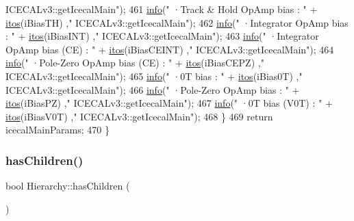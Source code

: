 \begin{DoxyCode}
{      ICECALv3::getIcecalMain"});
461         \hyperlink{classObject_a644fd329ea4cb85f54fa6846484b84a8}{info}(\textcolor{stringliteral}{"   ·Track & Hold OpAmp bias          : "} + \hyperlink{Tools_8h_af330027dbdafb9a30768b3613c553e60}{itos}(iBiasTH)          ,\textcolor{stringliteral}{"
      ICECALv3::getIcecalMain"});
462         \hyperlink{classObject_a644fd329ea4cb85f54fa6846484b84a8}{info}(\textcolor{stringliteral}{"   ·Integrator OpAmp bias            : "} + \hyperlink{Tools_8h_af330027dbdafb9a30768b3613c553e60}{itos}(iBiasINT)         ,\textcolor{stringliteral}{"
      ICECALv3::getIcecalMain"});
463         \hyperlink{classObject_a644fd329ea4cb85f54fa6846484b84a8}{info}(\textcolor{stringliteral}{"   ·Integrator OpAmp bias (CE)       : "} + \hyperlink{Tools_8h_af330027dbdafb9a30768b3613c553e60}{itos}(iBiasCEINT)       ,\textcolor{stringliteral}{"
      ICECALv3::getIcecalMain"});
464         \hyperlink{classObject_a644fd329ea4cb85f54fa6846484b84a8}{info}(\textcolor{stringliteral}{"   ·Pole-Zero OpAmp bias (CE)        : "} + \hyperlink{Tools_8h_af330027dbdafb9a30768b3613c553e60}{itos}(iBiasCEPZ)        ,\textcolor{stringliteral}{"
      ICECALv3::getIcecalMain"});
465         \hyperlink{classObject_a644fd329ea4cb85f54fa6846484b84a8}{info}(\textcolor{stringliteral}{"   ·0T bias                    : "} + \hyperlink{Tools_8h_af330027dbdafb9a30768b3613c553e60}{itos}(iBias0T)            ,\textcolor{stringliteral}{"
      ICECALv3::getIcecalMain"});
466         \hyperlink{classObject_a644fd329ea4cb85f54fa6846484b84a8}{info}(\textcolor{stringliteral}{"   ·Pole-Zero OpAmp bias             : "} + \hyperlink{Tools_8h_af330027dbdafb9a30768b3613c553e60}{itos}(iBiasPZ)          ,\textcolor{stringliteral}{"
      ICECALv3::getIcecalMain"});
467         \hyperlink{classObject_a644fd329ea4cb85f54fa6846484b84a8}{info}(\textcolor{stringliteral}{"   ·0T bias (V0T)              : "} + \hyperlink{Tools_8h_af330027dbdafb9a30768b3613c553e60}{itos}(iBiasV0T)           ,\textcolor{stringliteral}{"
      ICECALv3::getIcecalMain"});
468     \}
469     \textcolor{keywordflow}{return} icecalMainParams;
470 \}
\end{DoxyCode}
\mbox{\label{classHierarchy_a255174fe4d316d2a3f430dcb9dab29f1}} 
\subsubsection{\texorpdfstring{has\+Children()}{hasChildren()}}
{\footnotesize\ttfamily bool Hierarchy\+::has\+Children (\begin{DoxyParamCaption}{ }\end{DoxyParamCaption})\hspace{0.3cm}{\ttfamily [inherited]}}



